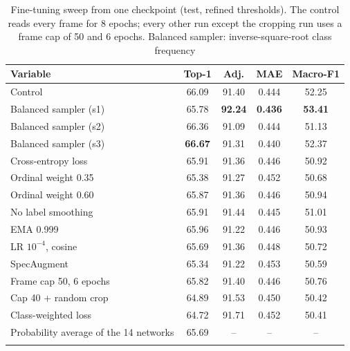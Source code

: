 \documentclass[pdflatex,sn-basic]{sn-jnl}
\begin{document}
\begin{table}[t]
\setlength{\tabcolsep}{3pt}
\caption{Fine-tuning sweep from one checkpoint (test, refined thresholds). The control reads every frame for 8 epochs; every other run except the cropping run uses a frame cap of 50 and 6 epochs. Balanced sampler: inverse-square-root class frequency}\label{tab:sweep}
\begin{tabular*}{0.8\textwidth}{@{\extracolsep\fill}lcccc}
\toprule
Variable & Top-1 & Adj. & MAE & Macro-F1\\
\midrule
Control & 66.09 & 91.40 & 0.444 & 52.25\\
Balanced sampler (s1) & 65.78 & \textbf{92.24} & \textbf{0.436} & \textbf{53.41}\\
Balanced sampler (s2) & 66.36 & 91.09 & 0.444 & 51.13\\
Balanced sampler (s3) & \textbf{66.67} & 91.31 & 0.440 & 52.37\\
Cross-entropy loss & 65.91 & 91.36 & 0.446 & 50.92\\
Ordinal weight 0.35 & 65.38 & 91.27 & 0.452 & 50.68\\
Ordinal weight 0.60 & 65.87 & 91.36 & 0.446 & 50.94\\
No label smoothing & 65.91 & 91.44 & 0.445 & 51.01\\
EMA 0.999 & 65.96 & 91.22 & 0.446 & 50.93\\
LR $10^{-4}$, cosine & 65.69 & 91.36 & 0.448 & 50.72\\
SpecAugment & 65.34 & 91.22 & 0.453 & 50.59\\
Frame cap 50, 6 epochs & 65.82 & 91.40 & 0.446 & 50.76\\
Cap 40 + random crop & 64.89 & 91.53 & 0.450 & 50.42\\
Class-weighted loss & 64.72 & 91.71 & 0.452 & 50.41\\
\midrule
Probability average of the 14 networks & 65.69 & -- & -- & --\\
\botrule
\end{tabular*}
\end{table}
\end{document}
